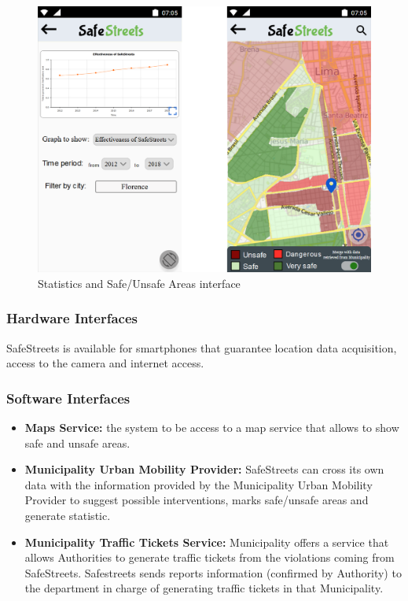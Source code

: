        \begin{figure}[h]
        \centering
        \includegraphics[scale=0.56]{Images/statistics_safe_unsafe2.png}
        \caption{Statistics and Safe/Unsafe Areas interface}
    \end{figure}
  
  \newpage
\subsubsection{Hardware Interfaces}
SafeStreets is available for smartphones that guarantee location data acquisition, access to the camera and internet access.

\subsubsection{Software Interfaces}
\begin{itemize}
    \item \textbf{Maps Service:} the system to be access to a map service that allows to show safe and unsafe areas.
    \item \textbf{Municipality Urban Mobility Provider:} SafeStreets can cross its own data with the information provided by the Municipality Urban Mobility Provider to suggest possible interventions, marks safe/unsafe areas and generate statistic.
    \item \textbf{Municipality Traffic Tickets Service:} Municipality offers a service that allows Authorities to generate traffic tickets from the violations coming from SafeStreets. Safestreets sends reports information (confirmed by Authority) to the department in charge of generating traffic tickets in that Municipality.
\end{itemize}

